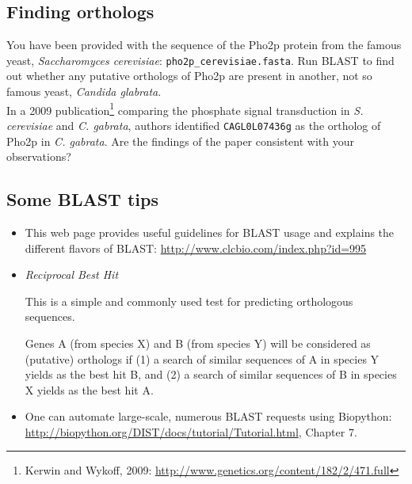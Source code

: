 \documentclass[a4paper,11pt]{article}
\begin{document}
\subsection{Finding orthologs}

You have been provided with the sequence of the Pho2p protein from the famous yeast, \emph{Saccharomyces cerevisiae}: \texttt{pho2p\_cerevisiae.fasta}. Run BLAST to find out whether any putative orthologs of Pho2p are present in another, not so famous yeast, \emph{Candida glabrata}.\\

In a 2009 publication\footnote{Kerwin and Wykoff, 2009: \url{http://www.genetics.org/content/182/2/471.full}} comparing the phosphate signal transduction in \emph{S. cerevisiae} and \emph{C. gabrata}, authors identified \texttt{CAGL0L07436g} as the ortholog of Pho2p in \emph{C. gabrata}. Are the findings of the paper consistent with your observations?

\subsection{Some BLAST tips}

\begin{itemize}
\item This web page provides useful guidelines for BLAST usage and explains the different flavors of BLAST:
\url{http://www.clcbio.com/index.php?id=995}

\item \emph{Reciprocal Best Hit}

This is a simple and commonly used test for predicting orthologous sequences.

Genes A (from species X) and B (from species Y) will be considered as (putative) orthologs if (1) a search of similar sequences of A in species Y yields as the best hit B, and (2) a search of similar sequences of B in species X yields as the best hit A.

\item One can automate large-scale, numerous BLAST requests using Biopython: \\
	\url{http://biopython.org/DIST/docs/tutorial/Tutorial.html}, Chapter 7.
\end{itemize}
\end{document}
